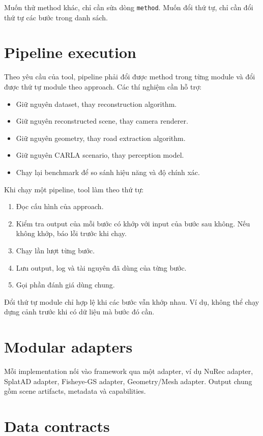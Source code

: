 Muốn thử method khác, chỉ cần sửa dòng \texttt{method}.
Muốn đổi thứ tự, chỉ cần đổi thứ tự các bước trong danh sách.

\section{Pipeline execution}

Theo yêu cầu của tool, pipeline phải đổi được method trong từng module và đổi được thứ tự module theo approach.
Các thí nghiệm cần hỗ trợ:
\begin{itemize}
  \item Giữ nguyên dataset, thay reconstruction algorithm.
  \item Giữ nguyên reconstructed scene, thay camera renderer.
  \item Giữ nguyên geometry, thay road extraction algorithm.
  \item Giữ nguyên CARLA scenario, thay perception model.
  \item Chạy lại benchmark để so sánh hiệu năng và độ chính xác.
\end{itemize}

Khi chạy một pipeline, tool làm theo thứ tự:
\begin{enumerate}
  \item Đọc cấu hình của approach.
  \item Kiểm tra output của mỗi bước có khớp với input của bước sau không. Nếu không khớp, báo lỗi trước khi chạy.
  \item Chạy lần lượt từng bước.
  \item Lưu output, log và tài nguyên đã dùng của từng bước.
  \item Gọi phần đánh giá dùng chung.
\end{enumerate}

Đổi thứ tự module chỉ hợp lệ khi các bước vẫn khớp nhau.
Ví dụ, không thể chạy dựng cảnh trước khi có dữ liệu mà bước đó cần.

\section{Modular adapters}

Mỗi implementation nối vào framework qua một adapter, ví dụ NuRec adapter, SplatAD adapter, Fisheye-GS adapter, Geometry/Mesh adapter.
Output chung gồm scene artifacts, metadata và capabilities.

\section{Data contracts}

